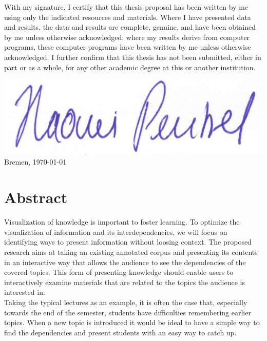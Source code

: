 \documentclass[twoside, 12pt]{article}
\begin{document}
\newpage
\noindent
  With my signature, I certify that this thesis proposal has been written by me
  using only the indicated resources and materials. Where I have
  presented data and results, the data and results are complete,
  genuine, and have been obtained by me unless otherwise acknowledged;
  where my results derive from computer programs, these computer
  programs have been written by me unless otherwise acknowledged. I
  further confirm that this thesis has not been submitted, either in
  part or as a whole, for any other academic degree at this or another
  institution.

  \vspace{20mm}

    \includegraphics[scale=0.2]{assets/Signature}
 \hfill Bremen, \today
  
\newpage

\thispagestyle{fancy} %


 \section*{Abstract}
 \label{sec:abstract}
Visualization of knowledge is important to foster learning. To optimize the visualization of information and its interdependencies, we will focus on identifying ways to present information without loosing context. The proposed research aims at taking an existing annotated corpus and presenting its contents in an interactive way that allows the audience to see the dependencies of the covered topics. This form of presenting knowledge should enable users to interactively examine materials that are related to the topics the audience is interested in.\\

Taking the typical lectures as an example, it is often the case that, especially towards the end of the semester, students have difficulties remembering earlier topics. When a new topic is introduced it would be ideal to have a simple way to find the dependencies and present students with an easy way to catch up.\\
\end{document}
